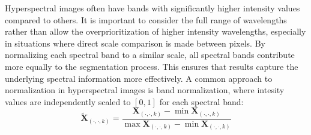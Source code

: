 Hyperspectral images often have bands with significantly higher intensity values compared to others. It is important to consider the full range of wavelengths rather than allow the overprioritization of higher intensity wavelengths, especially in situations where direct scale comparison is made between pixels. By normalizing each spectral band to a similar scale, all spectral bands contribute more equally to the segmentation process. This ensures that results capture the underlying spectral information more effectively. A common approach to normalization in hyperspectral images is band normalization, where intesity values are independently scaled to $[0,1]$ for each spectral band:
\begin{equation}
    \label{alg:normalization}
    \tilde{\mathbf{X}}_{(\cdot, \cdot, k)} =  \frac{\mathbf{X}_{(\cdot, \cdot, k)} - \min\mathbf{X}_{(\cdot, \cdot, k)}}{\max\mathbf{X}_{(\cdot, \cdot, k)} - \min\mathbf{X}_{(\cdot, \cdot, k)}}
\end{equation}
